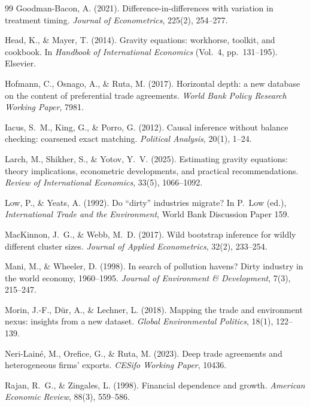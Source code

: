 \documentclass[12pt]{article}
\begin{document}
\begin{thebibliography}{99}
Goodman-Bacon, A. (2021).
Difference-in-differences with variation in treatment timing.
\emph{Journal of Econometrics}, 225(2), 254--277.

Head, K., \& Mayer, T. (2014).
Gravity equations: workhorse, toolkit, and cookbook.
In \emph{Handbook of International Economics} (Vol.~4, pp.~131--195). Elsevier.

Hofmann, C., Osnago, A., \& Ruta, M. (2017).
Horizontal depth: a new database on the content of preferential trade agreements.
\emph{World Bank Policy Research Working Paper}, 7981.

Iacus, S.~M., King, G., \& Porro, G. (2012).
Causal inference without balance checking: coarsened exact matching.
\emph{Political Analysis}, 20(1), 1--24.

Larch, M., Shikher, S., \& Yotov, Y.~V. (2025).
Estimating gravity equations: theory implications, econometric developments, and
practical recommendations.
\emph{Review of International Economics}, 33(5), 1066--1092.

Low, P., \& Yeats, A. (1992).
Do ``dirty'' industries migrate?
In P.~Low (ed.), \emph{International Trade and the Environment},
World Bank Discussion Paper 159.

MacKinnon, J.~G., \& Webb, M.~D. (2017).
Wild bootstrap inference for wildly different cluster sizes.
\emph{Journal of Applied Econometrics}, 32(2), 233--254.

Mani, M., \& Wheeler, D. (1998).
In search of pollution havens? Dirty industry in the world economy, 1960--1995.
\emph{Journal of Environment \& Development}, 7(3), 215--247.

Morin, J.-F., D\"ur, A., \& Lechner, L. (2018).
Mapping the trade and environment nexus: insights from a new dataset.
\emph{Global Environmental Politics}, 18(1), 122--139.

Neri-Lain\'e, M., Orefice, G., \& Ruta, M. (2023).
Deep trade agreements and heterogeneous firms' exports.
\emph{CESifo Working Paper}, 10436.

Rajan, R.~G., \& Zingales, L. (1998).
Financial dependence and growth.
\emph{American Economic Review}, 88(3), 559--586.


\end{thebibliography}
\end{document}
